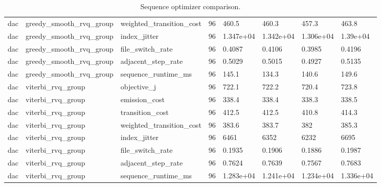 \begin{table}[t]
\begin{tabular}{llllllll}
dac & greedy\_smooth\_rvq\_group & weighted\_transition\_cost & 96 & 460.5 & 460.3 & 457.3 & 463.8 \\
dac & greedy\_smooth\_rvq\_group & index\_jitter & 96 & 1.347e+04 & 1.342e+04 & 1.306e+04 & 1.39e+04 \\
dac & greedy\_smooth\_rvq\_group & file\_switch\_rate & 96 & 0.4087 & 0.4106 & 0.3985 & 0.4196 \\
dac & greedy\_smooth\_rvq\_group & adjacent\_step\_rate & 96 & 0.5029 & 0.5015 & 0.4927 & 0.5135 \\
dac & greedy\_smooth\_rvq\_group & sequence\_runtime\_ms & 96 & 145.1 & 134.3 & 140.6 & 149.6 \\
dac & viterbi\_rvq\_group & objective\_j & 96 & 722.1 & 722.2 & 720.4 & 723.8 \\
dac & viterbi\_rvq\_group & emission\_cost & 96 & 338.4 & 338.4 & 338.3 & 338.5 \\
dac & viterbi\_rvq\_group & transition\_cost & 96 & 412.5 & 412.5 & 410.8 & 414.3 \\
dac & viterbi\_rvq\_group & weighted\_transition\_cost & 96 & 383.6 & 383.7 & 382 & 385.3 \\
dac & viterbi\_rvq\_group & index\_jitter & 96 & 6461 & 6352 & 6232 & 6695 \\
dac & viterbi\_rvq\_group & file\_switch\_rate & 96 & 0.1935 & 0.1906 & 0.1886 & 0.1987 \\
dac & viterbi\_rvq\_group & adjacent\_step\_rate & 96 & 0.7624 & 0.7639 & 0.7567 & 0.7683 \\
dac & viterbi\_rvq\_group & sequence\_runtime\_ms & 96 & 1.283e+04 & 1.241e+04 & 1.234e+04 & 1.336e+04 \\
\bottomrule
\end{tabular}
\caption{Sequence optimizer comparison.}
\label{tab:sequence-optimizer}
\end{table}